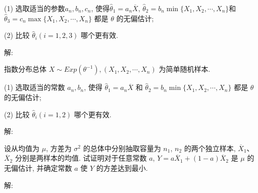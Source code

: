 \documentclass[standard]{ExBook}
\begin{document}
\begin{qitems}
\begin{bbox}
\begin{shaded}
(1) 选取适当的参数\(a_n, b_n, c_n\), 使得\(\hat{\theta}_1 = a_n \overline{X}\), \(\hat{\theta}_2 = b_n \min\{X_1, X_2, \cdots, X_n\}\)和\(\hat{\theta}_3 = c_n \max\{X_1, X_2, \cdots, X_n\}\) 都是 \(\theta\) 的无偏估计;

(2) 比较 \(\hat{\theta}_i (i = 1, 2, 3)\) 哪个更有效.
    \end{shaded}
    \end{bbox}

\vspace{-5em}

    \begin{bbox}
解: 
    \end{bbox}

\vspace{-5em}

    \begin{bbox}
    \begin{shaded}
        \qitem
指数分布总体 \(X \sim Exp(\theta^{-1}), (X_1, X_2, \cdots, X_n)\) 为简单随机样本.

(1) 选取适当的常数 \(a_n, b_n\), 使得 \(\hat{\theta}_1 = a_n \overline{X}\) 和 \(\hat{\theta}_2 = b_n \min\{X_1, X_2, \cdots, X_n\}\) 都是 \(\theta\) 的无偏估计;

(2) 比较 \(\hat{\theta}_i (i = 1, 2)\) 哪个更有效.
    \end{shaded}
    \end{bbox}

\vspace{-5em}

    \begin{bbox}
解: 
    \end{bbox}

\vspace{-5em}

    \begin{bbox}
    \begin{shaded}
        \qitem
设从均值为 \(\mu\), 方差为 \(\sigma^2\) 的总体中分别抽取容量为 \(n_1\), \(n_2\) 的两个独立样本, \(\overline{X}_1\)、\(\overline{X}_2\) 分别是两样本的均值. 试证明对于任意常数 \(a\), \(Y = a\overline{X}_1 + (1 - a)\overline{X}_2\) 是 \(\mu\) 的无偏估计, 并确定常数 \(a\) 使 \(Y\) 的方差达到最小.
    \end{shaded}
    \end{bbox}

\vspace{-5em}

    \begin{bbox}
解: 
    \end{bbox}


\end{qitems}
\end{document}
